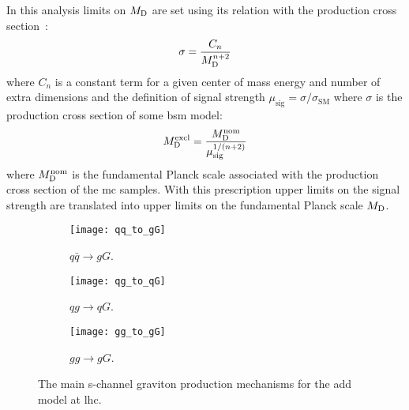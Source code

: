 In this analysis limits on $M_\mathrm{D}$ are set using its relation with the production
cross section~\cite{ADDPhenomenology}:
\begin{equation}
  \label{eq:116}
  \sigma = \frac{C_n}{M_\mathrm{D}^{n + 2}}
\end{equation}
where $C_n$ is a constant term for a given center of mass energy and number of
extra dimensions and the definition of signal strength
$\mu_\mathrm{sig} = \sigma/\sigma_\mathrm{SM}$ where $\sigma$ is the production
cross section of some \gls{bsm} model:
\begin{equation}
  \label{eq:117}
  M_\mathrm{D}^\mathrm{excl} = \frac{M_\mathrm{D}^\mathrm{nom}}{\mu^{1/(n + 2)}_\mathrm{sig}}
\end{equation}
where $M_\mathrm{D}^\mathrm{nom}$ is the fundamental Planck scale associated with the
production cross section of the \gls{mc} samples. With this prescription upper
limits on the signal strength are translated into upper limits on the
fundamental Planck scale $M_\mathrm{D}$.

\begin{figure}[!h]
  \centering
  \begin{subfigure}{.48\linewidth}
    \texttt{[image: qq\_to\_gG]}
    \caption{$q \bar{q} \rightarrow g G$.}
  \end{subfigure}
  \begin{subfigure}{.48\linewidth}
    \texttt{[image: qg\_to\_qG]}
    \caption{$q g \rightarrow q G$.}
  \end{subfigure}
  \begin{subfigure}{.48\linewidth}
    \texttt{[image: gg\_to\_gG]}
    \caption{$g g \rightarrow g G$.}
  \end{subfigure}
  \caption{The main s-channel graviton production mechanisms for the \gls{add}
    model at \gls{lhc}.}
  \label{fig:add_feynman}
\end{figure}
